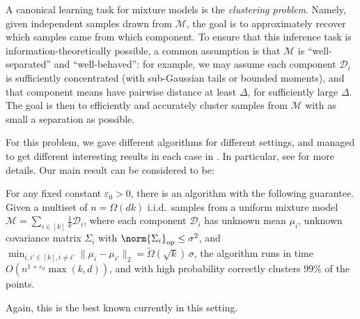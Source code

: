 A canonical learning task for mixture models is the \emph{clustering problem}.
Namely, given independent samples drawn from $\mathcal{M}$, the goal is to
approximately recover which samples came from which component.
To ensure that this inference task is information-theoretically possible,
a common assumption is that $\mathcal{M}$ is ``well-separated'' and ``well-behaved'':
for example, we may assume each component $\mathcal{D}_i$ is sufficiently concentrated
(with sub-Gaussian tails or bounded moments),
and that component means have pairwise distance at least $\Delta$, for sufficiently large $\Delta$.
The goal is then to efficiently and accurately cluster samples from $\mathcal{M}$ %
with as small a separation as possible.

For this problem, we gave different algorithms for different settings, and managed to get different interesting results in each case in \cite{robstat3}. In particular, see \cite[Cor.~6,~8,~9]{robstat3} for more details. Our main result can be considered to be:
\begin{theorem}[informal]
For any fixed constant $\varepsilon_0 > 0$, there is an algorithm with the following guarantee.
Given a multiset of $n = \Omega (d k)$ i.i.d.\ samples from a uniform mixture model
$\mathcal{M} = \sum_{i \in [k]} \frac 1 k \mathcal{D}_i$,
where each component $\mathcal{D}_i$ has unknown mean $\mu_i$, unknown covariance matrix $\Sigma_i$
with $\norm{\Sigma_i}_{\mathrm{op}} \leq \sigma^2$, and $\min_{i, i' \in [k], i \neq i'} \| \mu_i - \mu_{i'}\|_2 =
\widetilde\Omega(\sqrt{k}) \, \sigma$, the algorithm runs in time $O(n^{1 + \varepsilon_0} \max(k, d))$,
and with high probability correctly clusters $99\%$ of the points.
\end{theorem}
Again, this is the best known currently in this setting.


